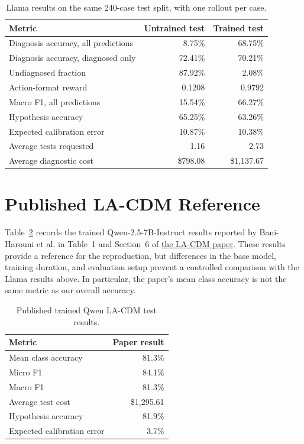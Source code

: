 \documentclass[11pt]{article}
\begin{document}
\begin{table}[ht]
  \centering
  \caption{Llama results on the same 240-case test split, with one rollout per
  case.}
  \label{tab:test}
  \begin{tabular}{lrr}
    \toprule
    Metric & Untrained test & Trained test \\
    \midrule
    Diagnosis accuracy, all predictions & 8.75\% & 68.75\% \\
    Diagnosis accuracy, diagnosed only & 72.41\% & 70.21\% \\
    Undiagnosed fraction & 87.92\% & 2.08\% \\
    Action-format reward & 0.1208 & 0.9792 \\
    Macro F1, all predictions & 15.54\% & 66.27\% \\
    Hypothesis accuracy & 65.25\% & 63.26\% \\
    Expected calibration error & 10.87\% & 10.38\% \\
    Average tests requested & 1.16 & 2.73 \\
    Average diagnostic cost & \$798.08 & \$1,137.67 \\
    \bottomrule
  \end{tabular}
\end{table}

\section{Published LA-CDM Reference}

Table~\ref{tab:paper} records the trained Qwen-2.5-7B-Instruct results
reported by Bani-Harouni et al. in Table~1 and Section~6 of
\href{https://arxiv.org/abs/2506.13474}{the LA-CDM paper}. These results
provide a reference for the reproduction, but differences in the base model,
training duration, and evaluation setup prevent a controlled comparison with
the Llama results above. In particular, the paper's mean class accuracy is
not the same metric as our overall accuracy.

\begin{table}[ht]
  \centering
  \caption{Published trained Qwen LA-CDM test results.}
  \label{tab:paper}
  \begin{tabular}{lr}
    \toprule
    Metric & Paper result \\
    \midrule
    Mean class accuracy & 81.3\% \\
    Micro F1 & 84.1\% \\
    Macro F1 & 81.3\% \\
    Average test cost & \$1,295.61 \\
    Hypothesis accuracy & 81.9\% \\
    Expected calibration error & 3.7\% \\
    \bottomrule
  \end{tabular}
\end{table}
\end{document}
